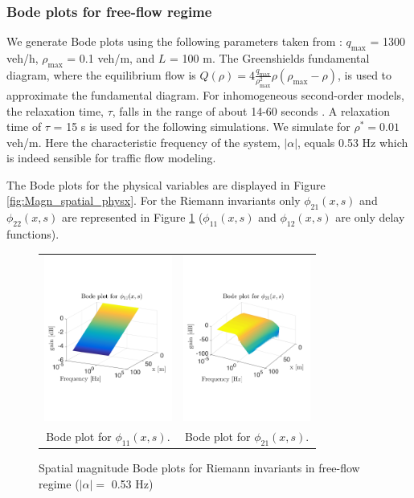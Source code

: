 \documentclass[5p,twocolumn]{elsarticle}
\begin{document}
\subsubsection{Bode plots for free-flow regime}

We generate Bode plots using the following parameters taken from \cite{Hofleitner}: $q_{\text{max}}$ = 1300 veh/h, $\rho_{\text{max}}$ = 0.1 veh/m, and $L$ = 100 m. The Greenshields fundamental diagram, where the equilibrium flow is $Q(\rho) = 4 \frac{q_{\text{max}}}{\rho_{\text{max}}^2}\rho (\rho_{\text{max}} - \rho)$, is used to approximate the fundamental diagram. For inhomogeneous second-order models, the relaxation time, $\tau$, falls in the range of about 14-60 seconds \cite{Fan}. A relaxation time of $\tau$ = 15 s is used for the following simulations. We simulate for $\rho^* = 0.01$ veh/m. Here the characteristic frequency of the system, $\left|\alpha\right|$, equals 0.53 Hz which is indeed sensible for traffic flow modeling.

The Bode plots for the physical variables are displayed in Figure \ref{fig:Magn_spatial_physx}.
For the Riemann invariants only $\phi_{21}(x,s)$ and $\phi_{22}(x,s)$ are represented in Figure \ref{fig:Magn_spatial_diag} ($\phi_{11}(x,s)$ and $\phi_{12}(x,s)$ are only delay functions).

\begin{figure}
\centering
\begin{tabular}{cc}
\includegraphics[trim = 0mm 60mm 0mm 60mm, width = 4.2cm]{distr_phi_11}
&
\includegraphics[trim = 0mm 60mm 0mm 60mm, width = 4.2cm]{distr_phi_21}
\tabularnewline
Bode plot for $\phi_{11}(x,s)$.
&
Bode plot for $\phi_{21}(x,s)$.
\tabularnewline

\end{tabular}
\caption{Spatial magnitude Bode plots for Riemann invariants in free-flow regime ($\left|\alpha\right| = $ 0.53 Hz)\label{fig:Magn_spatial_diag}}
\end{figure}
\end{document}
